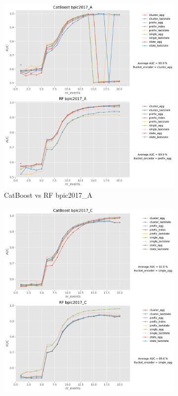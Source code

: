 \documentclass[twoside,11pt]{Latex/Classes/PhDthesisPSnPDF}
\begin{document}
\begin{figure}[t!]
	\begin{subfigure}{0.48\textwidth}
		\includegraphics[width=\linewidth]{images/catboost/graphsrf/bpic2017_A_CatBoost_rf.pdf}
		\caption{CatBoost vs RF bpic2017\_A} \label{fig:b17acr}
	\end{subfigure}\hspace*{\fill}
	\begin{subfigure}{0.48\textwidth}
		\includegraphics[width=\linewidth]{images/catboost/graphsrf/bpic2017_C_CatBoost_rf.pdf}

\end{subfigure}
\end{figure}
\end{document}
